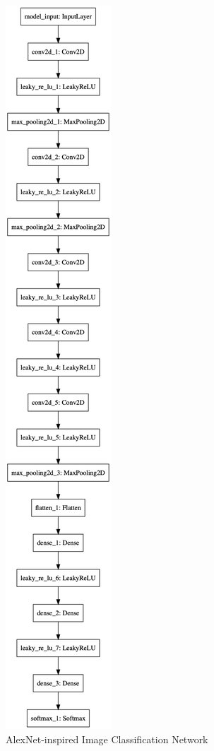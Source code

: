 \begin{figure}
    \centering
    \begin{center}
        \includegraphics[height=0.9\textheight]{alexnet/model.png}
    \end{center}
    \caption[AlexNet Network]{AlexNet-inspired Image Classification Network}
    \label{fig:alexnet}
\end{figure}

